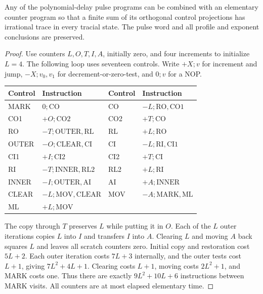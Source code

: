 \begin{lemma}\label{lem:irrational-marker}
Any of the polynomial-delay pulse programs can be combined with an elementary counter program so that a finite sum of its orthogonal control projections has irrational trace in every tracial state. The pulse word and all profile and exponent conclusions are preserved.
\end{lemma}
\begin{proof}
Use counters $L,O,T,I,A$, initially zero, and four increments to initialize $L=4$. The following loop uses seventeen controls. Write $+X;v$ for increment and jump, $-X;v_0,v_1$ for decrement-or-zero-test, and $0;v$ for a NOP.
\begin{center}\small
\begin{tabular}{ll@{\qquad}ll}
\toprule
Control & Instruction & Control & Instruction\\
\midrule
MARK &$0;\mathrm{CO}$&CO &$-L;\mathrm{RO},\mathrm{CO1}$\\
CO1 &$+O;\mathrm{CO2}$&CO2 &$+T;\mathrm{CO}$\\
RO &$-T;\mathrm{OUTER},\mathrm{RL}$&RL &$+L;\mathrm{RO}$\\
OUTER &$-O;\mathrm{CLEAR},\mathrm{CI}$&CI &$-L;\mathrm{RI},\mathrm{CI1}$\\
CI1 &$+I;\mathrm{CI2}$&CI2 &$+T;\mathrm{CI}$\\
RI &$-T;\mathrm{INNER},\mathrm{RL2}$&RL2 &$+L;\mathrm{RI}$\\
INNER &$-I;\mathrm{OUTER},\mathrm{AI}$&AI &$+A;\mathrm{INNER}$\\
CLEAR &$-L;\mathrm{MOV},\mathrm{CLEAR}$&MOV &$-A;\mathrm{MARK},\mathrm{ML}$\\
ML &$+L;\mathrm{MOV}$&&\\
\bottomrule
\end{tabular}
\end{center}
The copy through $T$ preserves $L$ while putting it in $O$. Each of the $L$ outer iterations copies $L$ into $I$ and transfers $I$ into $A$. Clearing $L$ and moving $A$ back squares $L$ and leaves all scratch counters zero. Initial copy and restoration cost $5L+2$. Each outer iteration costs $7L+3$ internally, and the outer tests cost $L+1$, giving $7L^2+4L+1$. Clearing costs $L+1$, moving costs $2L^2+1$, and MARK costs one. Thus there are exactly $9L^2+10L+6$ instructions between MARK visits. All counters are at most elapsed elementary time.


\end{proof}

